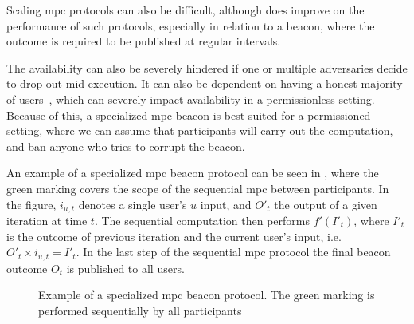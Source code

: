 Scaling \gls{mpc} protocols can also be difficult, although  does improve on the performance of such protocols, especially in relation to a beacon, where the outcome is required to be published at regular intervals.

The availability can also be severely hindered if one or multiple adversaries decide to drop out mid-execution.
It can also be dependent on having a honest majority of users~\cite{cascudo2017scrape}, which can severely impact availability in a permissionless setting.
Because of this, a specialized \gls{mpc} beacon is best suited for a permissioned setting, where we can assume that participants will carry out the computation, and ban anyone who tries to corrupt the beacon.

An example of a specialized \gls{mpc} beacon protocol can be seen in , where the green marking covers the scope of the sequential \gls{mpc} between participants.
In the figure, $i_{u,t}$ denotes a single user's $u$ input, and $O'_t$ the output of a given iteration at time $t$.
The sequential computation then performs $f'(I'_t)$, where $I'_t$ is the outcome of previous iteration and the current user's input, i.e.\ $O'_t \times i_{u,t} = I'_t$.
In the last step of the sequential \gls{mpc} protocol the final beacon outcome $O_t$ is published to all users.

\begin{figure}[hbt]
    \centering
    \footnotesize
    \caption{Example of a specialized \gls{mpc} beacon protocol. The green marking is performed sequentially by all participants}\label{fig:mpc_beacon}
\end{figure}


